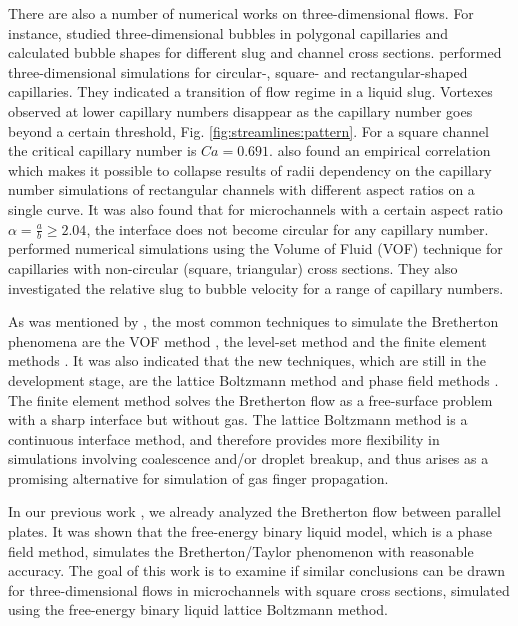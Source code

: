\documentclass[preprint,12pt]{elsarticle}
\begin{document}
There are also a number of numerical works on three-dimensional flows. For instance, 
\citet{wong-films,wong-pressure} studied
three-dimensional bubbles in
polygonal capillaries and calculated bubble shapes for different
slug and channel cross sections.
\citet{heil-threedim} performed three-dimensional simulations for circular-,
square- and rectangular-shaped capillaries. They indicated a transition of flow regime in a liquid
slug. Vortexes observed at lower capillary numbers disappear as the capillary number goes beyond a
certain threshold,  Fig. \ref{fig:streamlines:pattern}. For a square channel the critical
capillary number is $Ca=0.691$.  \citet{heil-threedim} also found an empirical
correlation which
makes it possible to collapse results of radii dependency on the capillary number
simulations of rectangular channels with different aspect ratios on a single curve.
It was also found that for microchannels with a certain aspect ratio $\alpha=\frac{a}{b}\geq
2.04$, the interface does not become
circular for any capillary number. \citet{wang-non-circular} performed numerical
simulations using the Volume of Fluid (VOF) technique for
capillaries with non-circular (square, triangular) cross sections. They also investigated the
relative slug to bubble velocity for
a range of capillary numbers. 

As was mentioned by \citet{gupta-review}, the most common techniques to simulate the Bretherton
phenomena are the VOF method \cite{wang-non-circular}, the level-set method
\cite{fukugata-levelset} and the finite element methods \cite{kreutzer-taylor,heil-threedim}. It was
also indicated \cite{gupta-review} that the new techniques, which are still in the development
stage,
are the lattice Boltzmann method and phase field methods \cite{anderson-diffuse,gurtin-binary}.
The finite element method solves the Bretherton flow as a free-surface problem with a sharp
interface but without gas.  The lattice Boltzmann method is a continuous
interface method, and therefore provides more flexibility in simulations involving coalescence
and/or
droplet breakup, and thus arises as a promising alternative for simulation of gas finger propagation. 

In our previous work \cite{kuzmin-binary2d}, we already analyzed the Bretherton flow between
parallel
plates.
It was shown that the free-energy binary liquid model, which is a phase field method, simulates the
Bretherton/Taylor phenomenon with reasonable accuracy. The goal of this work is to examine 
if similar conclusions can be drawn for three-dimensional flows in microchannels with square cross
sections,
simulated using the free-energy binary liquid lattice Boltzmann
method. 
\end{document}
